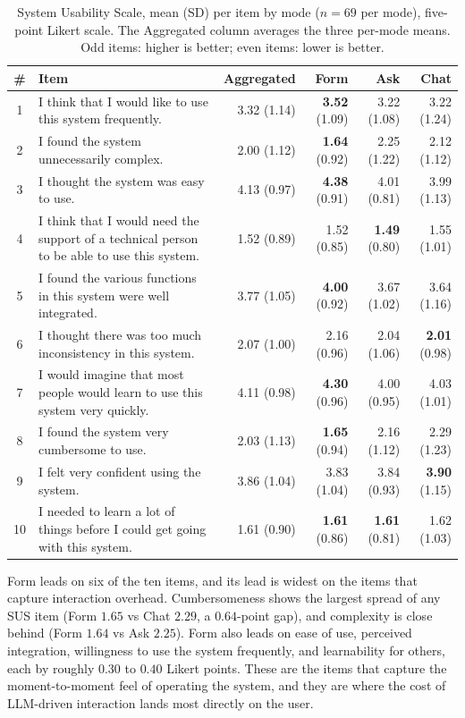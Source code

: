 \begin{table}[htbp]
\centering
\caption{System Usability Scale, mean (SD) per item by mode
($n = 69$ per mode), five-point Likert scale. The Aggregated
column averages the three per-mode means. Odd items: higher is
better; even items: lower is better.}
\label{tab:sus-per-item}
\small
\begin{tabularx}{\linewidth}{@{}c X r r r r@{}}
\toprule
\# & Item & Aggregated & Form & Ask & Chat \\
\midrule
1 & I think that I would like to use this system frequently. & 3.32 (1.14) & \textbf{3.52} (1.09) & 3.22 (1.08) & 3.22 (1.24) \\
2 & I found the system unnecessarily complex. & 2.00 (1.12) & \textbf{1.64} (0.92) & 2.25 (1.22) & 2.12 (1.12) \\
3 & I thought the system was easy to use. & 4.13 (0.97) & \textbf{4.38} (0.91) & 4.01 (0.81) & 3.99 (1.13) \\
4 & I think that I would need the support of a technical person to be able to use this system. & 1.52 (0.89) & 1.52 (0.85) & \textbf{1.49} (0.80) & 1.55 (1.01) \\
5 & I found the various functions in this system were well integrated. & 3.77 (1.05) & \textbf{4.00} (0.92) & 3.67 (1.02) & 3.64 (1.16) \\
6 & I thought there was too much inconsistency in this system. & 2.07 (1.00) & 2.16 (0.96) & 2.04 (1.06) & \textbf{2.01} (0.98) \\
7 & I would imagine that most people would learn to use this system very quickly. & 4.11 (0.98) & \textbf{4.30} (0.96) & 4.00 (0.95) & 4.03 (1.01) \\
8 & I found the system very cumbersome to use. & 2.03 (1.13) & \textbf{1.65} (0.94) & 2.16 (1.12) & 2.29 (1.23) \\
9 & I felt very confident using the system. & 3.86 (1.04) & 3.83 (1.04) & 3.84 (0.93) & \textbf{3.90} (1.15) \\
10 & I needed to learn a lot of things before I could get going with this system. & 1.61 (0.90) & \textbf{1.61} (0.86) & \textbf{1.61} (0.81) & 1.62 (1.03) \\
\bottomrule
\end{tabularx}
\end{table}

Form leads on six of the ten items, and its lead is widest on the
items that capture interaction overhead. Cumbersomeness shows the
largest spread of any SUS item (Form $1.65$ vs Chat $2.29$, a
$0.64$-point gap), and complexity is close behind (Form $1.64$ vs
Ask $2.25$). Form also leads on ease of use, perceived
integration, willingness to use the system frequently, and
learnability for others, each by roughly $0.30$ to $0.40$ Likert
points. These are the items that capture the moment-to-moment feel
of operating the system, and they are where the cost of LLM-driven
interaction lands most directly on the user.

